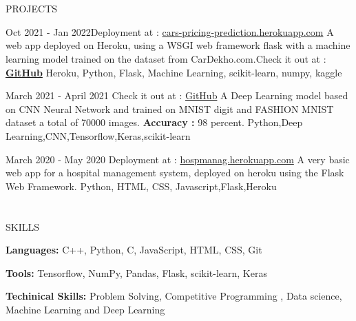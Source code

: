 \documentclass{my_cv}
\begin{document}
\begin{multicols}{2}
\section{\faPencil}{PROJECTS}
    
%
    {Oct 2021 - Jan 2022\newline Deployment at : {\href{https://cars-pricing-prediction.herokuapp.com/}{cars-pricing-prediction.herokuapp.com}}}
    {A web app deployed on Heroku, using a WSGI web framework flask with a machine learning model trained on the dataset from CarDekho.com.\newline Check it out at : {\textbf{\href{https://github.com/AnkitDevri/carPricePrediction}{GitHub}}} 
    }
    {Heroku, Python, Flask, Machine Learning, scikit-learn, numpy, kaggle}
    \par
%
    {March 2021 - April 2021 \newline Check it out at : {\href{https://github.com/AnkitDevri/Denosing-Autoencoder}{GitHub}} 
    }%
    {A Deep Learning model based on CNN Neural Network and trained on MNIST digit and FASHION MNIST dataset a total of 70000 images. \textbf{Accuracy :} 98 percent. }%
    {Python,Deep Learning,CNN,Tensorflow,Keras,scikit-learn}
    \par
{}%
    {March 2020 - May 2020 \newline Deployment at : {\href{https://hospmanag.herokuapp.com/}{hospmanag.herokuapp.com}}}%
    {A very basic web app for a hospital management system, deployed on heroku using the Flask Web Framework. }%
    {Python, HTML, CSS, Javascript,Flask,Heroku}
     

    
    
\section{\faList}{SKILLS}

\textbf{Languages:} C++, Python, C, JavaScript, HTML, CSS, Git

\noindent\textbf{Tools:} Tensorflow, NumPy, Pandas, Flask, scikit-learn, Keras

\noindent\textbf{Techinical Skills:} Problem Solving, Competitive Programming , Data science, Machine Learning and Deep Learning

\columnbreak


\end{multicols}
\end{document}
